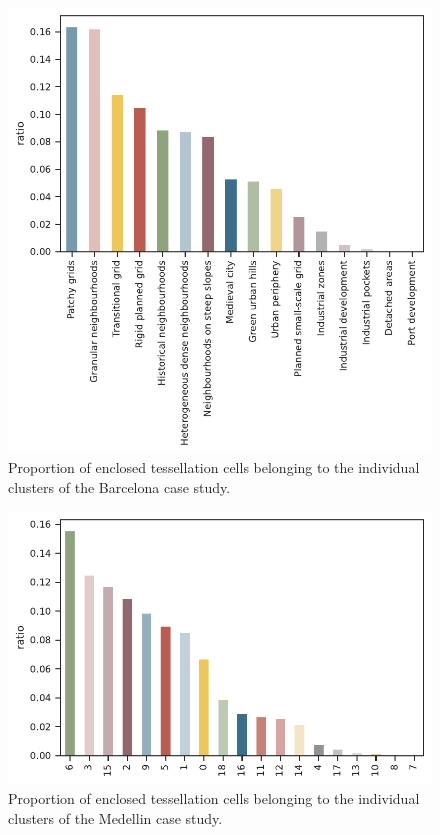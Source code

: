 \begin{figure}
  \includegraphics[width=\linewidth]{figures/counts_bcn.pdf}
  \caption{Proportion of enclosed tessellation cells belonging to the individual
  clusters of the Barcelona case study. }
  \label{fig:counts_bcn}
\end{figure}

\begin{figure}
  \includegraphics[width=\linewidth]{figures/counts_med.pdf}
  \caption{Proportion of enclosed tessellation cells belonging to the individual
  clusters of the Medellin case study. }
  \label{fig:counts_med}
\end{figure}

